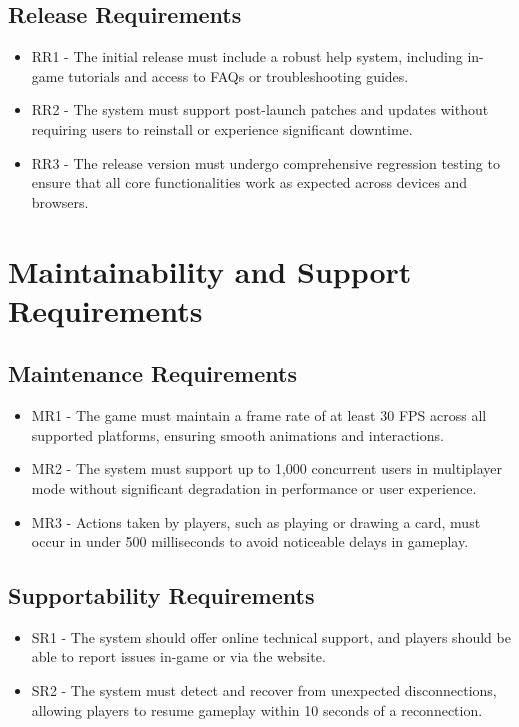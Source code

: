 \documentclass[12pt]{article}
\begin{document}
\subsection{Release Requirements}
\begin{itemize}
    \item RR1 - The initial release must include a robust help system, including in-game tutorials and access to FAQs or troubleshooting guides.
    \item RR2 - The system must support post-launch patches and updates without requiring users to reinstall or experience significant downtime.
    \item RR3 - The release version must undergo comprehensive regression testing to ensure that all core functionalities work as expected across devices and browsers.
\end{itemize}

\section{Maintainability and Support Requirements}

\subsection{Maintenance Requirements}
\begin{itemize}
    \item MR1 - The game must maintain a frame rate of at least 30 FPS across all supported platforms, ensuring smooth animations and interactions.
    \item MR2 - The system must support up to 1,000 concurrent users in multiplayer mode without significant degradation in performance or user experience.
    \item MR3 - Actions taken by players, such as playing or drawing a card, must occur in under 500 milliseconds to avoid noticeable delays in gameplay.
\end{itemize}

\subsection{Supportability Requirements}
\begin{itemize}
    \item SR1 - The system should offer online technical support, and players should be able to report issues in-game or via the website.
    \item SR2 - The system must detect and recover from unexpected disconnections, allowing players to resume gameplay within 10 seconds of a reconnection.
\end{itemize}
\end{document}
